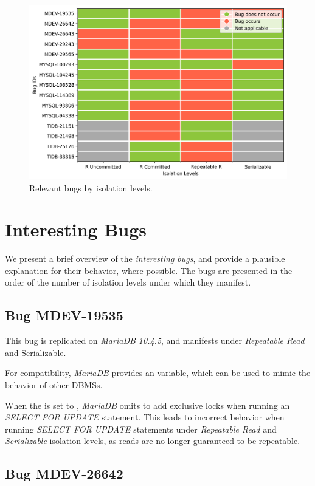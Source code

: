 \begin{figure}
    \centering
    \includegraphics[width=0.9\linewidth]{assets/bug_replication_interesting_bugs_by_isolation_lvl.png}
    \caption{Relevant bugs by isolation levels.}
    \label{fig:interesting_bugs_by_isolation_lvl}
\end{figure}

\section{Interesting Bugs}

We present a brief overview of the \textit{interesting bugs}, and provide a plausible explanation for their behavior, where possible. The bugs are presented in the order of the number of isolation levels under which they manifest.

\subsection*{Bug MDEV-19535}

This bug is replicated on \textit{MariaDB 10.4.5}, and manifests under \textit{Repeatable Read} and {Serializable}.

For compatibility, \textit{MariaDB} provides an  variable, which can be used to mimic the behavior of other DBMSs.

When the  is set to , \textit{MariaDB} omits to add exclusive locks when running an \textit{SELECT FOR UPDATE} statement. This leads to incorrect behavior when running \textit{SELECT FOR UPDATE} statements under \textit{Repeatable Read} and \textit{Serializable} isolation levels, as reads are no longer guaranteed to be repeatable.

\subsection*{Bug MDEV-26642}


